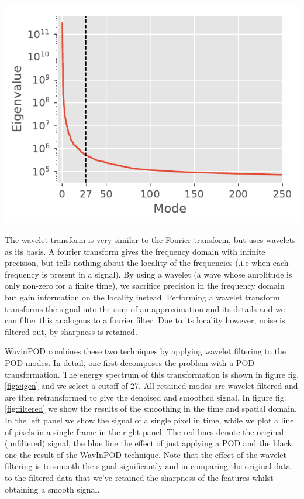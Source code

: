 \documentclass{Dissertate}
\let\origfigure\figure
\let\endorigfigure\endfigure
\renewenvironment{figure}[1][2] {
    \expandafter\origfigure\expandafter[H]
} {
    \endorigfigure
}
\begin{document}
\begin{figure}
\hypertarget{fig:eigen}{%
\centering
\includegraphics{source/figures/pdf/eigenspectrum.pdf}
\caption{Caption.}\label{fig:eigen}
}
\end{figure}

The wavelet transform is very similar to the Fourier transform, but uses
wavelets as its basis. A fourier transform gives the frequency domain
with infinite precision, but tells nothing about the locality of the
frequencies (.i.e when each frequency is present in a signal). By using
a wavelet (a wave whose amplitude is only non-zero for a finite time),
we sacrifice precision in the frequency domain but gain information on
the locality instead. Performing a wavelet transform transforms the
signal into the sum of an approximation and its details and we can
filter this analogous to a fourier filter. Due to its locality however,
noise is filtered out, by sharpness is retained.

WavinPOD combines these two techniques by applying wavelet filtering to
the POD modes. In detail, one first decomposes the problem with a POD
transformation. The energy spectrum of this transformation is shown in
figure fig.\ref{fig:eigen} and we select a cutoff of 27. All retained
modes are wavelet filtered and are then retransformed to give the
denoised and smoothed signal. In figure fig.\ref{fig:filtered} we show
the results of the smoothing in the time and spatial domain. In the left
panel we show the signal of a single pixel in time, while we plot a line
of pixels in a single frame in the right panel. The red lines denote the
original (unfiltered) signal, the blue line the effect of just applying
a POD and the black one the result of the WavInPOD technique. Note that
the effect of the wavelet filtering is to smooth the signal
significantly and in comparing the original data to the filtered data
that we've retained the sharpness of the features whilst obtaining a
smooth signal.
\end{document}

